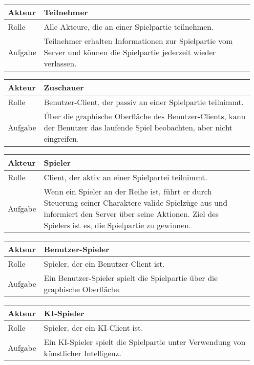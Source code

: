 \begin{tabularx}{16cm}{l|X}
	\textbf{Akteur} & \textbf{Teilnehmer} \\
	\hline
	Rolle & Alle Akteure, die an einer Spielpartie teilnehmen.\\ 
	\hline
	Aufgabe & Teilnehmer erhalten Informationen zur Spielpartie vom Server und können die Spielpartie jederzeit wieder verlassen.\\ 
\end{tabularx}

\begin{tabularx}{16cm}{l|X}
	\textbf{Akteur} & \textbf{Zuschauer} \\
	\hline
	Rolle & Benutzer-Client, der passiv an einer Spielpartie teilnimmt.\\ 
	\hline
	Aufgabe & Über die graphische Oberfläche des Benutzer-Clients, kann der Benutzer das laufende Spiel beobachten, aber nicht eingreifen. \\ 
\end{tabularx}

\begin{tabularx}{16cm}{l|X}
	\textbf{Akteur} & \textbf{Spieler} \\
	\hline
	Rolle & Client, der aktiv an einer Spielpartei teilnimmt.\\ 
	\hline
	Aufgabe & Wenn ein Spieler an der Reihe ist, führt er durch Steuerung seiner Charaktere valide Spielzüge aus und informiert den Server über seine Aktionen. Ziel des Spielers ist es, die Spielpartie zu gewinnen.\\ 
\end{tabularx}

\begin{tabularx}{16cm}{l|X}
	\textbf{Akteur} & \textbf{Benutzer-Spieler} \\
	\hline
	Rolle & Spieler, der ein Benutzer-Client ist.\\ 
	\hline
	Aufgabe & Ein Benutzer-Spieler spielt die Spielpartie über die graphische Oberfläche.\\ 
\end{tabularx}

\begin{tabularx}{16cm}{l|X}
	\textbf{Akteur} & \textbf{KI-Spieler} \\
	\hline
	Rolle & Spieler, der ein KI-Client ist.\\ 
	\hline
	Aufgabe & Ein KI-Spieler spielt die Spielpartie unter Verwendung von künstlicher Intelligenz.\\ 
\end{tabularx}

